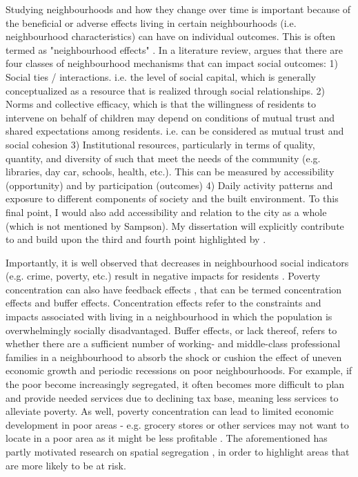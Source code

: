 Studying neighbourhoods and how they change over time is important because of the beneficial or adverse effects living in certain neighbourhoods (i.e. neighbourhood characteristics) can have on individual outcomes. This is often termed as "neighbourhood effects" \cite{sampson_assessing_2002}. In a literature review,  argues that there are four classes of neighbourhood mechanisms that can impact social outcomes:
1) Social ties / interactions. i.e. the level of social capital, which is generally conceptualized as a resource that is realized through social relationships.
2) Norms and collective efficacy, which is that the willingness of residents to intervene on behalf of children may depend on conditions of mutual trust and shared expectations among residents. i.e. can be considered as mutual trust and social cohesion
3) Institutional resources, particularly in terms of quality, quantity, and diversity of such that meet the needs of the community (e.g. libraries, day car, schools, health, etc.). This can be measured by accessibility (opportunity) and by participation (outcomes)
4) Daily activity patterns and exposure to different components of society and the built environment. To this final point, I would also add accessibility and relation to the city as a whole (which is not mentioned by Sampson). My dissertation will explicitly contribute to and build upon the third and fourth point highlighted by .


Importantly, it is well observed that decreases in neighbourhood social indicators (e.g. crime, poverty, etc.) result in negative impacts for  residents  \cite{sampson_assessing_2002}. Poverty concentration can also have feedback effects \cite{wilson_truly_2012}, that can be termed concentration effects and buffer effects. Concentration effects refer to the constraints and impacts associated with living in a neighbourhood in which the population is overwhelmingly socially disadvantaged. Buffer effects, or lack thereof, refers to whether there are a sufficient number of working- and middle-class professional families in a neighbourhood to absorb the shock or cushion the effect of uneven economic growth and periodic recessions on poor neighbourhoods. For example, if the poor become increasingly segregated, it often becomes more difficult to plan and provide needed services due to declining tax base, meaning less services to alleviate poverty. As well, poverty concentration can lead to limited economic development in poor areas - e.g. grocery stores or other services may not want to locate in a poor area as it might be less profitable \cite{ades_are_2012}. The aforementioned has partly motivated research on spatial segregation \cite{massey_dimensions_1988}, in order to highlight areas that are more likely to be at risk.

